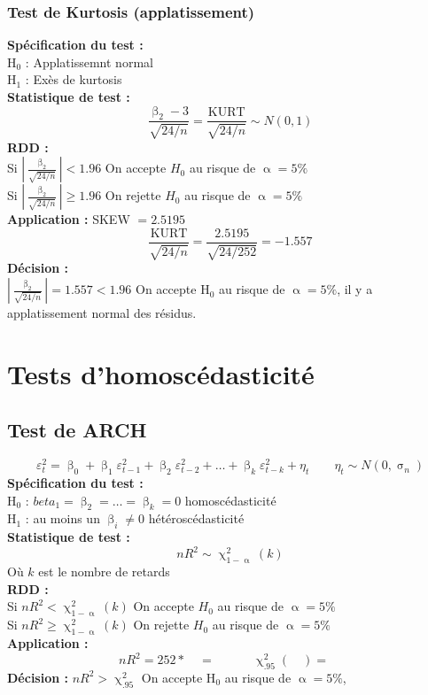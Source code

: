 \documentclass[A4paper]{article}
\begin{document}
\subsubsection{Test de Kurtosis (applatissement)}
\textbf{Spécification du test :} \\
H$_0$ : Applatissemnt normal \\
H$_1$ : Exès de kurtosis \\
\textbf{Statistique de test :}
\begin{equation*}
		\frac{\upbeta_2-3}{\sqrt{24/n}}=  \frac{\text{KURT}}{\sqrt{24/n}} \sim N(0,1)
\end{equation*}
\textbf{RDD :} \\
Si $\left| \frac{\upbeta_2}{\sqrt{24/n}} \right|  < 1.96$ On accepte $H_0$ au risque de $\upalpha = 5\% $\\
Si $\left| \frac{\upbeta_2}{\sqrt{24/n}} \right|  \geq 1.96$ On rejette $H_0$ au risque de $\upalpha = 5\%$ \\
\textbf{Application :} SKEW $= 2.5195 $
\begin{equation*}
	\frac{\text{KURT}}{\sqrt{24/n}} = \frac{2.5195}{\sqrt{24/252}} = -1.557
\end{equation*}
\textbf{Décision :}\\
$\left| \frac{\upbeta_2}{\sqrt{24/n}} \right| = 1.557 < 1.96 $ On accepte H$_0$ au risque de  $\upalpha=5\%$, il y a applatissement normal des résidus.

\newpage
\section{Tests d'homoscédasticité}
\subsection{Test de ARCH}
\begin{equation*}
		\varepsilon^2_t = \upbeta_0 + \upbeta_1 \varepsilon^2_{t-1} + \upbeta_2 \varepsilon^2_{t-2} + \ldots + \upbeta_k \varepsilon^2_{t-k} + \eta_t \qquad \eta_t \sim N(0,\upsigma_n)
\end{equation*}
\textbf{Spécification du test :} \\
H$_0$ : $beta_1 = \upbeta_2 = \ldots = \upbeta_k = 0$ homoscédasticité \\
H$_1$ : au moins un $\upbeta_i \neq 0$ hétéroscédasticité \\
\textbf{Statistique de test :}
\begin{equation*}
		nR^2 \sim \upchi^2_{1-\upalpha}(k)
\end{equation*}
Où $k$ est le nombre de retards \\
\textbf{RDD :} \\
Si $nR^2 < \upchi^2_{1-\upalpha}(k)$ On accepte $H_0$ au risque de $\upalpha = 5\%$\\
Si $nR^2 \geq \upchi^2_{1-\upalpha}(k)$ On rejette $H_0$ au risque de $\upalpha = 5\%$ \\
\textbf{Application :}
\begin{equation*}
	nR^2 = 252 * \quad = \quad \qquad \upchi^2_{.95}(\quad) = \quad 
\end{equation*}
\textbf{Décision : }
$nR^2 > \upchi^2_{.95}$ On accepte H$_0$ au risque de $\upalpha = 5\%$,
\newpage
\end{document}
